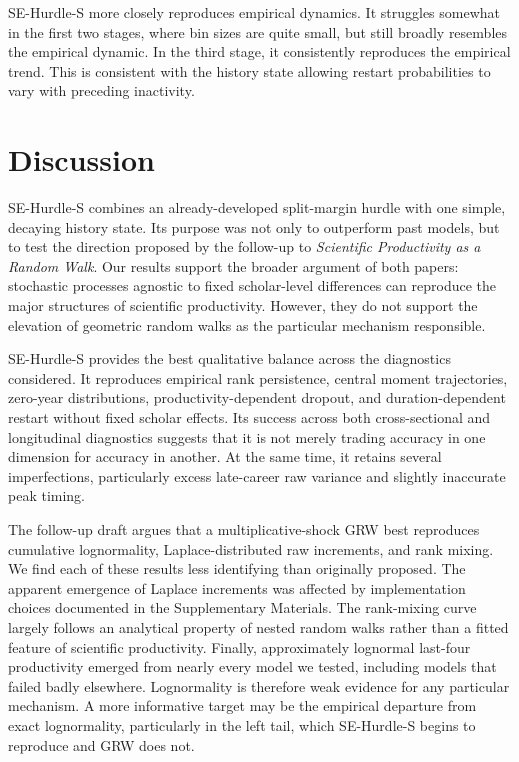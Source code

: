 \documentclass[twocolumn, letterpaper]{article}
\begin{document}
SE-Hurdle-S more closely reproduces empirical dynamics. It struggles somewhat in the first two stages, where bin sizes are quite small, but still broadly resembles the empirical dynamic. In the third stage, it consistently reproduces the empirical trend. This is consistent with the history state allowing restart probabilities to vary with preceding inactivity.

\section{Discussion}
\label{sec:discussion}

SE-Hurdle-S combines an already-developed split-margin hurdle with one simple, decaying history state. Its purpose was not only to outperform past models, but to test the direction proposed by the follow-up to \textit{Scientific Productivity as a Random Walk}. Our results support the broader argument of both papers: stochastic processes agnostic to fixed scholar-level differences can reproduce the major structures of scientific productivity. However, they do not support the elevation of geometric random walks as the particular mechanism responsible.

SE-Hurdle-S provides the best qualitative balance across the diagnostics considered. It reproduces empirical rank persistence, central moment trajectories, zero-year distributions, productivity-dependent dropout, and duration-dependent restart without fixed scholar effects. Its success across both cross-sectional and longitudinal diagnostics suggests that it is not merely trading accuracy in one dimension for accuracy in another. At the same time, it retains several imperfections, particularly excess late-career raw variance and slightly inaccurate peak timing.

The follow-up draft argues that a multiplicative-shock GRW best reproduces cumulative lognormality, Laplace-distributed raw increments, and rank mixing. We find each of these results less identifying than originally proposed. The apparent emergence of Laplace increments was affected by implementation choices documented in the Supplementary Materials. The rank-mixing curve largely follows an analytical property of nested random walks rather than a fitted feature of scientific productivity. Finally, approximately lognormal last-four productivity emerged from nearly every model we tested, including models that failed badly elsewhere. Lognormality is therefore weak evidence for any particular mechanism. A more informative target may be the empirical departure from exact lognormality, particularly in the left tail, which SE-Hurdle-S begins to reproduce and GRW does not.
\end{document}
